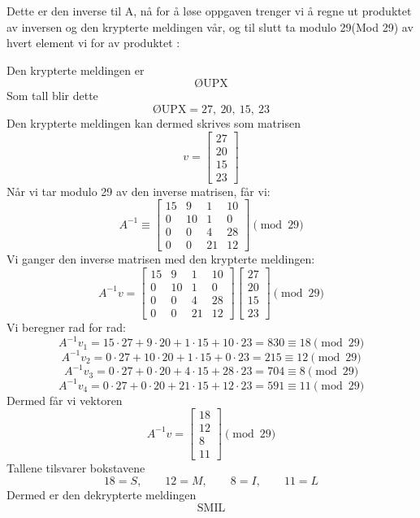 \documentclass[12pt,a4paper]{article}
\begin{document}
\vspace{1.5cm}

Dette er den inverse til A, nå for å løse oppgaven trenger vi å regne ut produktet av inversen og den krypterte meldingen vår, og til slutt ta modulo 29(Mod 29) av hvert element vi for av produktet :

\vspace{1cm}

Den krypterte meldingen er \[ \text{ØUPX} \] Som tall blir dette \[ \text{ØUPX} = 27,\ 20,\ 15,\ 23 \] Den krypterte meldingen kan dermed skrives som matrisen \[ v = \begin{bmatrix} 27 \\ 20 \\ 15 \\ 23 \end{bmatrix} \] Når vi tar modulo 29 av den inverse matrisen, får vi: \[ A^{-1} \equiv \begin{bmatrix} 15 & 9 & 1 & 10 \\ 0 & 10 & 1 & 0 \\ 0 & 0 & 4 & 28 \\ 0 & 0 & 21 & 12 \end{bmatrix} \pmod{29} \] Vi ganger den inverse matrisen med den krypterte meldingen: \[ A^{-1}v = \begin{bmatrix} 15 & 9 & 1 & 10 \\ 0 & 10 & 1 & 0 \\ 0 & 0 & 4 & 28 \\ 0 & 0 & 21 & 12 \end{bmatrix} \begin{bmatrix} 27 \\ 20 \\ 15 \\ 23 \end{bmatrix} \pmod{29} \] Vi beregner rad for rad: \[ A^{-1}v_1 = 15\cdot27 + 9\cdot20 + 1\cdot15 + 10\cdot23 = 830 \equiv 18 \pmod{29} \] \[ A^{-1}v_2 = 0\cdot27 + 10\cdot20 + 1\cdot15 + 0\cdot23 = 215 \equiv 12 \pmod{29} \] \[ A^{-1}v_3 = 0\cdot27 + 0\cdot20 + 4\cdot15 + 28\cdot23 = 704 \equiv 8 \pmod{29} \] \[ A^{-1}v_4 = 0\cdot27 + 0\cdot20 + 21\cdot15 + 12\cdot23 = 591 \equiv 11 \pmod{29} \] Dermed får vi vektoren \[ A^{-1}v = \begin{bmatrix} 18 \\ 12 \\ 8 \\ 11 \end{bmatrix} \pmod{29} \] Tallene tilsvarer bokstavene \[ 18 = S,\qquad 12 = M,\qquad 8 = I,\qquad 11 = L \] Dermed er den dekrypterte meldingen \[ \boxed{\text{SMIL}} \]
\end{document}
